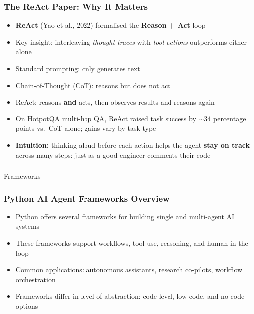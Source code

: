 \begin{frame}[fragile]\frametitle{The ReAct Paper: Why It Matters}
\begin{itemize}
    \item \textbf{ReAct} (Yao et al., 2022) formalised the \textbf{Reason + Act} loop
    \item Key insight: interleaving \emph{thought traces} with \emph{tool actions} outperforms either alone
    \item Standard prompting: only generates text
    \item Chain-of-Thought (CoT): reasons but does not act
    \item ReAct: reasons \textbf{and} acts, then observes results and reasons again
    \item On HotpotQA multi-hop QA, ReAct raised task success by $\sim$34 percentage points vs.\ CoT alone; gains vary by task type
    \item \textbf{Intuition:} thinking aloud before each action helps the agent \textbf{stay on track} across many steps: just as a good engineer comments their code
\end{itemize}
\end{frame}

\begin{frame}[fragile]\frametitle{}
\begin{center}
{\Large Frameworks}
\end{center}
\end{frame}

\begin{frame}[fragile]\frametitle{Python AI Agent Frameworks Overview}
    \begin{itemize}
        \item Python offers several frameworks for building single and multi-agent AI systems
        \item These frameworks support workflows, tool use, reasoning, and human-in-the-loop
        \item Common applications: autonomous assistants, research co-pilots, workflow orchestration
        \item Frameworks differ in level of abstraction: code-level, low-code, and no-code options
    \end{itemize}
\end{frame}

